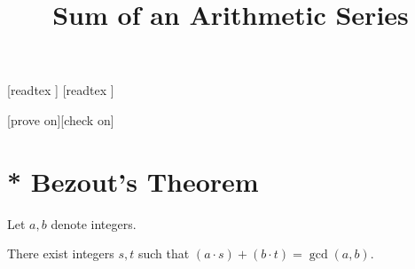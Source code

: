 \documentclass{article}
\title{Sum of an Arithmetic Series}
\author{}
\date{}
\begin{document}
\maketitle

\begin{forthel}

    [readtex ]
    [readtex ]

    [prove on][check on]
\end{forthel}


\section{* Bezout's Theorem}


\begin{forthel}

Let $a,b$ denote integers.

\begin{proposition}
There exist integers $s,t$ such that $(a \cdot s) + (b \cdot t) = \gcd(a,b)$.
\end{proposition}

\end{forthel}
\end{document}
